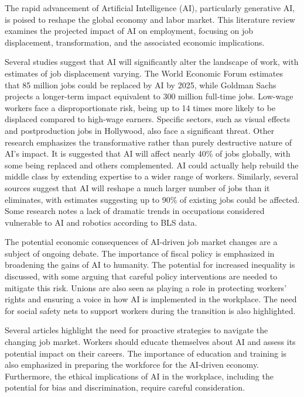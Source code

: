 \documentclass[a4paper,headinclude=on,footinclude=on,12pt,oneside]{scrbook}
\begin{document}

The rapid advancement of Artificial Intelligence (AI), particularly generative AI, is poised to reshape the global economy and labor market. This literature review examines the projected impact of AI on employment, focusing on job displacement, transformation, and the associated economic implications.


Several studies suggest that AI will significantly alter the landscape of work, with estimates of job displacement varying. The World Economic Forum estimates that 85 million jobs could be replaced by AI by 2025, while Goldman Sachs projects a longer-term impact equivalent to 300 million full-time jobs. Low-wage workers face a disproportionate risk, being up to 14 times more likely to be displaced compared to high-wage earners. Specific sectors, such as visual effects and postproduction jobs in Hollywood, also face a significant threat. Other research emphasizes the transformative rather than purely destructive nature of AI’s impact. It is suggested that AI will affect nearly 40\% of jobs globally, with some being replaced and others complemented. AI could actually help rebuild the middle class by extending expertise to a wider range of workers. Similarly, several sources suggest that AI will reshape a much larger number of jobs than it eliminates, with estimates suggesting up to 90\% of existing jobs could be affected. Some research notes a lack of dramatic trends in occupations considered vulnerable to AI and robotics according to BLS data.


The potential economic consequences of AI-driven job market changes are a subject of ongoing debate. The importance of fiscal policy is emphasized in broadening the gains of AI to humanity. The potential for increased inequality is discussed, with some arguing that careful policy interventions are needed to mitigate this risk. Unions are also seen as playing a role in protecting workers’ rights and ensuring a voice in how AI is implemented in the workplace. The need for social safety nets to support workers during the transition is also highlighted.


Several articles highlight the need for proactive strategies to navigate the changing job market. Workers should educate themselves about AI and assess its potential impact on their careers. The importance of education and training is also emphasized in preparing the workforce for the AI-driven economy. Furthermore, the ethical implications of AI in the workplace, including the potential for bias and discrimination, require careful consideration.
\end{document}
